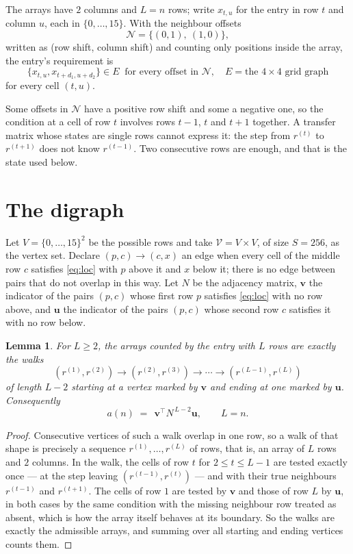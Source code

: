\documentclass[11pt,a4paper]{article}
\theoremstyle{plain}
\newtheorem{lemma}[theorem]{Lemma}
\theoremstyle{definition}
\begin{document}
The arrays have $2$ columns and $L=n$ rows; write $x_{t,u}$ for the entry in
row $t$ and column $u$, each in $\{0,\dots,15\}$. With the neighbour offsets
\[
\mathcal N=\{(0,1),\ (1,0)\},
\]
written as (row shift, column shift) and counting only positions inside the array, the
entry's requirement is
\begin{equation}\label{eq:loc}
\{x_{t,u},x_{t+d_1,u+d_2}\}\in E\ \text{ for every offset in }\mathcal N,\quad E=\text{the 4}\times\text{4 grid graph}
\end{equation}
for every cell $(t,u)$.

Some offsets in $\mathcal N$ have a positive row shift and some a negative one, so the
condition at a cell of row $t$ involves rows $t-1$, $t$ and $t+1$ together. A transfer
matrix whose states are single rows cannot express it: the step from $r^{(t)}$ to
$r^{(t+1)}$ does not know $r^{(t-1)}$. Two consecutive rows are enough, and that is
the state used below.

\section{The digraph}

Let $V=\{0,\dots,15\}^{2}$ be the possible rows and take
$\mathcal V=V\times V$, of size $S=256$, as the vertex set. Declare $(p,c)\to(c,x)$ an edge
when every cell of the middle row $c$ satisfies \eqref{eq:loc} with $p$ above it and $x$
below it; there is no edge between pairs that do not overlap in this way. Let $N$ be the
adjacency matrix, $\mathbf{v}$ the indicator of the pairs $(p,c)$ whose first row $p$
satisfies \eqref{eq:loc} with no row above, and $\mathbf{u}$ the indicator of
the pairs $(p,c)$ whose second row $c$ satisfies it with no row below.

\begin{lemma}\label{lem:walk}
For $L\ge2$, the arrays counted by the entry with $L$ rows are exactly the walks
\[
(r^{(1)},r^{(2)})\to(r^{(2)},r^{(3)})\to\cdots\to(r^{(L-1)},r^{(L)})
\]
of length $L-2$ starting at a vertex marked by $\mathbf{v}$ and ending at one marked by
$\mathbf{u}$. Consequently
\[
a(n)\;=\;\,\mathbf{v}^{\!\top}N^{\,L-2}\mathbf{u},\qquad L=n .
\]
\end{lemma}

\begin{proof}
Consecutive vertices of such a walk overlap in one row, so a walk of that shape is
precisely a sequence $r^{(1)},\dots,r^{(L)}$ of rows, that is, an array of $L$ rows
and $2$ columns. In the walk, the cells of row $t$ for $2\le t\le L-1$ are tested
exactly once --- at the step leaving $(r^{(t-1)},r^{(t)})$ --- and with their true
neighbours $r^{(t-1)}$ and $r^{(t+1)}$. The cells of row $1$ are tested by
$\mathbf{v}$ and those of row $L$ by $\mathbf{u}$, in both cases by the same condition
with the missing neighbour row treated as absent, which is how the array itself behaves at
its boundary. So the walks are exactly the admissible arrays, and summing over all starting
and ending vertices counts them.
\end{proof}
\end{document}
